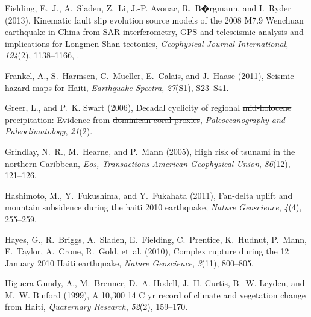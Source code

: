 \documentclass[linenumbers,draft]{agujournal}
\providecommand{\DIFaddtex}[1]{{\protect\color{blue}\uwave{#1}}} %
\providecommand{\DIFdeltex}[1]{{\protect\color{red}\sout{#1}}}                      %
\providecommand{\DIFaddbegin}{} %
\providecommand{\DIFaddend}{} %
\providecommand{\DIFdelbegin}{} %
\providecommand{\DIFdelend}{} %
\providecommand{\DIFadd}[1]{\texorpdfstring{\DIFaddtex{#1}}{#1}} %
\providecommand{\DIFdel}[1]{\texorpdfstring{\DIFdeltex{#1}}{}} %
\begin{document}
\begin{thebibliography}{65}
Fielding, E.~J., A.~Sladen, Z.~Li, J.-P. Avouac, R.~B�rgmann, and I.~Ryder
  (2013), {Kinematic fault slip evolution source models of the 2008 M7.9
  Wenchuan earthquake in China from SAR interferometry, GPS and teleseismic
  analysis and implications for Longmen Shan tectonics}, \textit{Geophysical
  Journal International}, \textit{194}(2), 1138--1166,
  .

Frankel, A., S.~Harmsen, C.~Mueller, E.~Calais, and J.~Haase (2011), {Seismic
  hazard maps for Haiti}, \textit{Earthquake Spectra}, \textit{27}(S1),
  S23--S41.

Greer, L., and P.~K. Swart (2006), \DIFaddbegin {\DIFaddend Decadal cyclicity of regional \DIFdelbegin \DIFdel{mid-holocene
  }\DIFdelend \DIFaddbegin \DIFadd{mid-Holocene
  }\DIFaddend precipitation: Evidence from \DIFdelbegin \DIFdel{dominican coral proxies}\DIFdelend \DIFaddbegin \DIFadd{Dominican coral proxies}}\DIFaddend ,
  \textit{Paleoceanography and Paleoclimatology}, \textit{21}(2).

Grindlay, N.~R., M.~Hearne, and P.~Mann (2005), {High risk of tsunami in the
  northern Caribbean}, \textit{Eos, Transactions American Geophysical Union},
  \textit{86}(12), 121--126.

Hashimoto, M., Y.~Fukushima, and Y.~Fukahata (2011), Fan-delta uplift and
  mountain subsidence during the haiti 2010 earthquake, \textit{Nature
  Geoscience}, \textit{4}(4), 255--259.

Hayes, G., R.~Briggs, A.~Sladen, E.~Fielding, C.~Prentice, K.~Hudnut, P.~Mann,
  F.~Taylor, A.~Crone, R.~Gold, et~al. (2010), Complex rupture during the 12
  {January 2010 Haiti} earthquake, \textit{Nature Geoscience}, \textit{3}(11),
  800--805.

Higuera-Gundy, A., M.~Brenner, D.~A. Hodell, J.~H. Curtis, B.~W. Leyden, and
  M.~W. Binford (1999), A 10,300 14 {C yr record of climate and vegetation
  change from Haiti}, \textit{Quaternary Research}, \textit{52}(2), 159--170.


\end{thebibliography}
\end{document}
